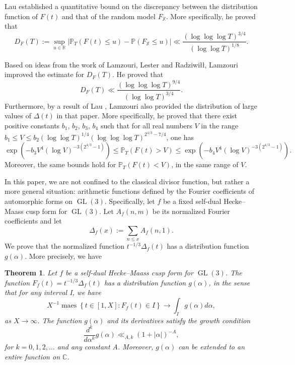 \documentclass[10pt,leqno]{amsart}
\numberwithin{equation}{section}
\newtheorem{theorem}[definition]{{Theorem}}
\begin{document}
 Lau \cite{MR1916279}  established a quantitative bound on the discrepancy between the distribution function of $F(t)$ and that of the random model $F_\mathbb{X}$. More specifically, he proved that 
\[
D_F(T) := \sup_{u \in \mathbb{R}} \left| \mathbb{P}_T(F(t) \leqslant u) - \mathbb{P}(F_{\mathbb{X}} \leqslant u) \right|\ll \frac{(\log\log \log T)^{3/4}}{(\log \log T)^{1/8}}.
\]

Based on ideas from the work \cite{MR4041109} of Lamzouri, Lester and Radziwiłł, Lamzouri \cite{MR4855345} improved the estimate for $D_F(T)$. He proved that
\[
D_F(T) \ll \frac{(\log\log \log  T)^{9/4}}{(\log \log T)^{3/4}}.
\]
Furthermore, by a result of Lau \cite{MR1862056},  Lamzouri also provided the distribution of large values of $\Delta(t)$ in that paper. More specifically, he proved that there exist positive constants $b_1$, $b_2$, $b_3$, $b_4$ such that for all real numbers $V$ in the range $b_1\leqslant V\leqslant b_2(\log \log T)^{1/4}(\log\log \log T)^{2^{4/3}-7/4}$, one has
\[
\exp(-b_3V^4(\log V)^{-3(2^{4/3}-1)})\leqslant \mathbb{P}_T(F(t)>V)\leqslant \exp(-b_4V^4(\log V)^{-3(2^{4/3}-1)}).
\]
Moreover, the same bounds hold for $\mathbb{P}_T(F(t)<V)$, in the same range of $V$. 

In this paper, we are not confined to the classical divisor function, but rather  a more general situation: arithmetic functions defined by the Fourier coefficients of automorphic forms on $\operatorname{GL}(3)$. 
Specifically, let $f$ be a fixed self-dual Hecke--Maass cusp form for $\operatorname{GL}(3)$. Let $A_f(n,m)$ be its normalized Fourier coefficients and let
\[
\Delta_f(x):=\sum_{n\leqslant x}A_f(n,1).
\]
We prove that the normalized function $t^{-1/3} \Delta_f\left(t\right)$ has a  distribution function $g(\alpha)$. More precisely, we have
\begin{theorem}\label{th1.2}
    Let $f$ be a self-dual Hecke--Maass cusp form for $\operatorname{GL}(3)$. The function  $F_f(t)=t^{-1/3}\Delta_f\left(t\right)$ has a distribution function $g(\alpha)$,  in the sense that for any interval I, we have
\[
X^{-1} \operatorname{maes}\left\{t \in[1, X]: F_f(t) \in I\right\} \rightarrow \int_I g(\alpha) d \alpha,
\]
as $X \rightarrow \infty$. The function $g(\alpha)$ and its derivatives satisfy the growth condition
\[
\frac{d^k}{d \alpha^k} g(\alpha) \ll_{A, k}(1+|\alpha|)^{-A},
\]
for $k=0,1,2, \ldots$ and any constant A. Moreover, $g(\alpha)$ can be extended to an entire function on $\mathbb{C}$.
\end{theorem}
\end{document}
